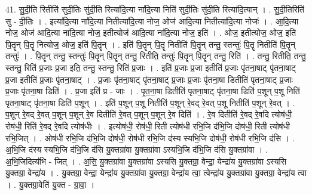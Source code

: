 \documentclass[17pt]{extarticle}
\begin{document}
41. सु॒दी॒ति रितीति॑ सुदी॒तिः सु॑दी॒ति रित्या॑दि॒त्या ना॑दि॒त्या निति॑ सुदी॒तिः सु॑दी॒ति रित्या॑दि॒त्यान् । . सु॒दी॒तिरिति॑ सु - दी॒तिः । . इत्या॑दि॒त्या ना॑दि॒त्या नितीत्या॑दि॒त्या नोज॒ ओज॑ आदि॒त्या नितीत्या॑दि॒त्या नोजः॑ । . आ॒दि॒त्या नोज॒ ओज॑ आदि॒त्या ना॑दि॒त्या नोज॒ इतीत्योज॑ आदि॒त्या ना॑दि॒त्या नोज॒ इति॑ । . ओज॒ इतीत्योज॒ ओज॒ इति॑ पि॒तॄन् पि॒तॄ नित्योज॒ ओज॒ इति॑ पि॒तॄन् । . इति॑ पि॒तॄन् पि॒तॄ नितीति॑ पि॒तॄन् तन्तु॒ स्तन्तुः॑ पि॒तॄ नितीति॑ पि॒तॄन् तन्तुः॑ । . पि॒तॄन् तन्तु॒ स्तन्तुः॑ पि॒तॄन् पि॒तॄन् तन्तु॒ रितीति॒ तन्तुः॑ पि॒तॄन् पि॒तॄन् तन्तु॒ रिति॑ । . तन्तु॒ रितीति॒ तन्तु॒ स्तन्तु॒ रिति॑ प्र॒जाः प्र॒जा इति॒ तन्तु॒ स्तन्तु॒ रिति॑ प्र॒जाः । . इति॑ प्र॒जाः प्र॒जा इतीति॑ प्र॒जाः पृ॑तना॒षाट् पृ॑तना॒षाट् प्र॒जा इतीति॑ प्र॒जाः पृ॑तना॒षाट् । . प्र॒जाः पृ॑तना॒षाट् पृ॑तना॒षाट् प्र॒जाः प्र॒जाः पृ॑तना॒षा डितीति॑ पृतना॒षाट् प्र॒जाः प्र॒जाः पृ॑तना॒षा डिति॑ । . प्र॒जा इति॑ प्र - जाः । . पृ॒त॒ना॒षा डितीति॑ पृतना॒षाट् पृ॑तना॒षा डिति॑ प॒शून् प॒शू निति॑ पृतना॒षाट् पृ॑तना॒षा डिति॑ प॒शून् । . इति॑ प॒शून् प॒शू नितीति॑ प॒शून् रे॒वद् रे॒वत् प॒शू नितीति॑ प॒शून् रे॒वत् । . प॒शून् रे॒वद् रे॒वत् प॒शून् प॒शून् रे॒व दितीति॑ रे॒वत् प॒शून् प॒शून् रे॒व दिति॑ । . रे॒व दितीति॑ रे॒वद् रे॒वदि त्योष॑धी॒ रोष॑धी॒ रिति॑ रे॒वद् रे॒वदि त्योष॑धीः । . इत्योष॑धी॒ रोष॑धी॒ रिती त्योष॑धी रभि॒जि द॑भि॒जि दोष॑धी॒ रिती त्योष॑धी रभि॒जित् । . ओष॑धी रभि॒जि द॑भि॒जि दोष॑धी॒ रोष॑धी रभि॒जि द॑स्य स्यभि॒जि दोष॑धी॒ रोष॑धी रभि॒जि द॑सि । . अ॒भि॒जि द॑स्य स्यभि॒जि द॑भि॒जि द॑सि यु॒क्तग्रा॑वा यु॒क्तग्रा॑वा ऽस्यभि॒जि द॑भि॒जि द॑सि यु॒क्तग्रा॑वा । . अ॒भि॒जिदित्य॑भि - जित् । . अ॒सि॒ यु॒क्तग्रा॑वा यु॒क्तग्रा॑वा ऽस्यसि यु॒क्तग्रा॒ वेन्द्रा॒ येन्द्रा॑य यु॒क्तग्रा॑वा ऽस्यसि यु॒क्तग्रा॒ वेन्द्रा॑य । . यु॒क्तग्रा॒ वेन्द्रा॒ येन्द्रा॑य यु॒क्तग्रा॑वा यु॒क्तग्रा॒ वेन्द्रा॑य त्वा॒ त्वेन्द्रा॑य यु॒क्तग्रा॑वा यु॒क्तग्रा॒ वेन्द्रा॑य त्वा । . यु॒क्तग्रा॒वेति॑ यु॒क्त - ग्रा॒वा॒ । \newline
\pagebreak
{}
\end{document}
